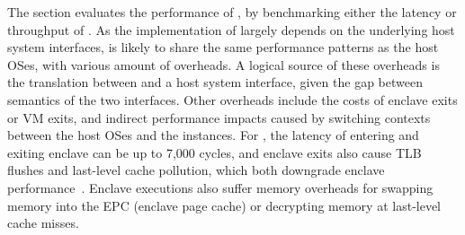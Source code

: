 The section evaluates the performance of \thehostabi{},
by benchmarking 
either the latency or throughput of \hostapis{}.
As the implementation of \hostapis{} largely depends on
the underlying host system interfaces,
\thehostabi{} is likely to share the same performance patterns
as the host OSes,
with various amount of overheads.
A logical source of these overheads
is the translation between \hostapis{}
and a host system interface,
given the gap between semantics of the two interfaces.
Other overheads include the costs of enclave exits or VM exits, and indirect performance impacts
caused by switching contexts between the host OSes and the \libos{} instances.
For \sgx{}, the latency of entering and exiting enclave can be up to \roughly{}7,000 cycles,
and enclave exits also cause TLB flushes and last-level cache pollution, which both downgrade enclave performance~\cite{orenbach17eleos}.
Enclave executions also suffer memory overheads
for swapping memory into the EPC (enclave page cache)
or decrypting memory
at last-level cache misses.


